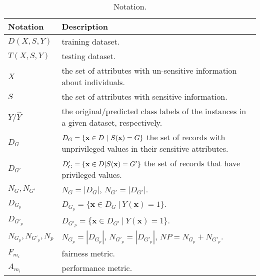 
\begin{table}[h]
\begin{small}
\begin{tabularx}{\columnwidth}{|l|X|}
\hline
\textbf{Notation} &\textbf{Description} \\ \hline
$D(X, S, Y)$ & training dataset. \\ \hline
$T(X, S, Y)$ & testing dataset. \\ \hline
$X$ & the set of attributes with un-sensitive information about individuals. \\ \hline
$S$ & the set of attributes with sensitive information. \\ \hline
$Y/\widehat{Y}$ & the original/predicted class labels of the instances 
in a given dataset, respectively. \\ \hline
$D_G$ & $D_G = \{{\bf x} \in D\ |\ S({\bf x}) = G\}$ the set of records with unprivileged values in their sensitive attributes. \\ \hline
$D_{G'}$ & $D_G' = \{{\bf x} \in D | S({\bf x}) = G'\}$ the set of records that have privileged values. \\ \hline
$N_G, N_{G'}$ & $N_G = |D_G|$, $N_{G'} = |D_{G'}|$. \\ \hline
$D_{G_p}$ & $D_{G_p} = \{\boldsymbol{x} \in D_G\ |\ Y(\boldsymbol{x}) = 1\}$. \\ \hline
$D_{{G'}_p}$ & $D_{{G'}_p} = \{\boldsymbol{x} \in D_{G'}\ |\ Y(\boldsymbol{x}) = 1\}$. \\ \hline
$N_{G_p}, N_{G'_p}, N_p$ & $N_{G_p} = |D_{G_p}|$, $N_{G'_p} = |D_{G'_p}|$, $NP = N_{G_p} + N_{G'_p}$. \\ \hline
$F_{m_i}$ & fairness metric. \\ \hline
$A_{m_i}$ & performance metric.\\ \hline 
\end{tabularx}
\caption{\label{tab:notation} Notation.}
\end{small}
\vskip -0.1in
\end{table}
